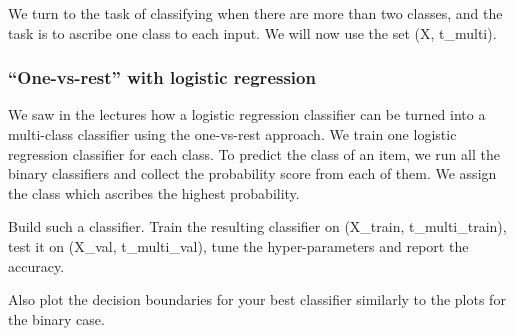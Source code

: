 \documentclass[11pt]{article}
\begin{document}
We turn to the task of classifying when there are more than two classes,
and the task is to ascribe one class to each input. We will now use the
set (X, t\_multi).

    \hypertarget{one-vs-rest-with-logistic-regression}{%
\subsubsection{``One-vs-rest'' with logistic
regression}\label{one-vs-rest-with-logistic-regression}}

We saw in the lectures how a logistic regression classifier can be
turned into a multi-class classifier using the one-vs-rest approach. We
train one logistic regression classifier for each class. To predict the
class of an item, we run all the binary classifiers and collect the
probability score from each of them. We assign the class which ascribes
the highest probability.

Build such a classifier. Train the resulting classifier on (X\_train,
t\_multi\_train), test it on (X\_val, t\_multi\_val), tune the
hyper-parameters and report the accuracy.

Also plot the decision boundaries for your best classifier similarly to
the plots for the binary case.
\end{document}
